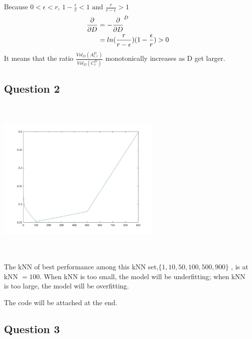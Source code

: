 \documentclass{article}
\begin{document}
Because $ 0 < \epsilon < r $, $1 -\frac{\epsilon}{r} <1 \text{ and } \frac{r}{r-\epsilon}>1$
\begin{equation}
  \begin{split}
    \pdv{}{D} (\frac{Vol_{D} (A_{\epsilon, r}^{D})}{Vol_{D} (C_{r}^{D})}) &= - \pdv{}{D} (1- \frac{\epsilon}{r})^D\\
    &= ln(\frac{r}{r-\epsilon})(1- \frac{\epsilon}{r}) >0
  \end{split}
\end{equation}
It means that the ratio $\frac{Vol_{D} (A_{\epsilon, r}^{D})}{Vol_{D} (C_{r}^{D})}$ monotonically increases as D get larger.

\subsection*{ Question 2}

\includegraphics[width=8cm, height=8cm]{Code/q2}

The kNN of best performance among this kNN set,$ \{ 1, 10, 50, 100, 500, 900\} $ , is at kNN $= 100$.
When kNN is too small, the model will be underfitting; when kNN is too large, the model will be overfitting.

The code will be attached at the end.




\subsection*{ Question 3}
\end{document}
